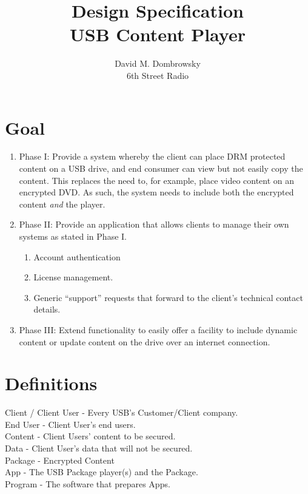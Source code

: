 \documentclass{article}
\title{Design Specification \\ USB Content Player}
\author{David M. Dombrowsky \\ 6th Street Radio}
\begin{document}
\maketitle

\section{Goal}

\begin{enumerate}

\item Phase I: Provide a system whereby the client can place DRM
protected content on a USB drive, and end consumer can view but not
easily copy the content.  This replaces the need to, for example,
place video content on an encrypted DVD.  As such, the system needs to
include both the encrypted content {\it and} the player.

\item Phase II: Provide an application that allows clients to manage
their own systems as stated in Phase I.
    \begin{enumerate}
    \item Account authentication
    \item License management.
    \item Generic “support” requests that forward to the client’s 
          technical contact details.
    \end{enumerate}

\item Phase III: Extend functionality to easily offer a facility to
include dynamic content or update content on the drive over an
internet connection.

\end{enumerate}
\newpage
\tableofcontents
\listoffigures
\newpage

\section{Definitions}
Client / Client User - Every USB's Customer/Client company.\\
End User - Client User's end users.\\
Content - Client Users' content to be secured.\\
Data - Client User's data that will not be secured.\\
Package - Encrypted Content\\
App - The USB Package player(s) and the Package.\\
Program - The software that prepares Apps.\\
\end{document}
